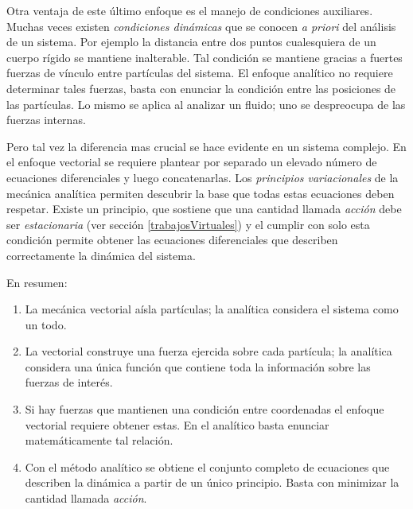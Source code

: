 \documentclass[12pt,spanish,a4paper]{article}
\begin{document}
Otra ventaja de este último enfoque es el manejo de condiciones auxiliares.
Muchas veces existen \emph{condiciones dinámicas} que se conocen \emph{a priori} del análisis de un sistema.
Por ejemplo la distancia entre dos puntos cualesquiera de un cuerpo rígido se mantiene inalterable.
Tal condición se mantiene gracias a fuertes fuerzas de vínculo entre partículas del sistema.
El enfoque analítico no requiere determinar tales fuerzas, basta con enunciar la condición entre las posiciones de las partículas.
Lo mismo se aplica al analizar un fluido; uno se despreocupa de las fuerzas internas.

Pero tal vez la diferencia mas crucial se hace evidente en un sistema complejo.
En el enfoque vectorial se requiere plantear por separado un elevado número de ecuaciones diferenciales y luego concatenarlas.
Los \emph{principios variacionales} de la mecánica analítica permiten descubrir la base que todas estas ecuaciones deben respetar.
Existe un principio, que sostiene que una cantidad llamada \emph{acción} debe ser \emph{estacionaria} (ver sección \ref{trabajosVirtuales}) y el cumplir con solo esta condición permite obtener las ecuaciones diferenciales que describen correctamente la dinámica del sistema.

En resumen:
\begin{enumerate}
	\item La mecánica vectorial aísla partículas; la analítica considera el sistema como un todo.
	\item La vectorial construye una fuerza ejercida sobre cada partícula; la analítica considera una única función que contiene toda la información sobre las fuerzas de interés.
	\item Si hay fuerzas que mantienen una condición entre coordenadas el enfoque vectorial requiere obtener estas. En el analítico basta enunciar matemáticamente tal relación.
	\item Con el método analítico se obtiene el conjunto completo de ecuaciones que describen la dinámica a partir de un único principio. Basta con minimizar la cantidad llamada \emph{acción}. 
\end{enumerate}
\end{document}
